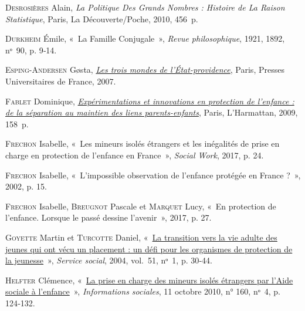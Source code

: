 \documentclass[
  12,
  a4paper,
]{report}
\newlength{\cslhangindent}
\newlength{\cslentryspacingunit} %
\newenvironment{CSLReferences}[2] %
 {%
  \setlength{\parindent}{0pt}
  \ifodd #1
  \let\oldpar\par
  \def\par{\hangindent=\cslhangindent\oldpar}
  \fi
  \setlength{\parskip}{#2\cslentryspacingunit}
 }%
 {}
\begin{document}
\begin{CSLReferences}{0}{0}
\leavevmode{}%
\textsc{Desrosières} Alain, \emph{La Politique Des Grands Nombres :
Histoire de La Raison Statistique}, {Paris}, {La Découverte/Poche},
2010, 456~p.

\leavevmode{}%
\textsc{Durkheim} Émile, {«~La Famille Conjugale~»}, \emph{Revue
philosophique}, 1921, 1892, nᵒ~90, p. 9‑14.

\leavevmode{}%
\textsc{Esping-Andersen} Gøsta,
\emph{\href{https://doi.org/10.3917/puf.espin.2007.01}{Les trois mondes
de l'État-providence}}, {Paris}, {Presses Universitaires de France},
2007.

\leavevmode{}%
\textsc{Fablet} Dominique,
\emph{\href{https://books.google.com?id=1sVU7YJiU0wC}{Expérimentations
et innovations en protection de l'enfance : de la séparation au maintien
des liens parents-enfants}}, {Paris}, {L'Harmattan}, 2009, 158~p.

\leavevmode{}%
\textsc{Frechon} Isabelle, {«~Les mineurs isolés étrangers et les
inégalités de prise en charge en protection de l'enfance en France~»},
\emph{Social Work}, 2017, p. 24.

\leavevmode{}%
\textsc{Frechon} Isabelle, {«~L'impossible observation de l'enfance
protégée en France ?~»}, 2002, p. 15.

\leavevmode{}%
\textsc{Frechon} Isabelle, \textsc{Breugnot} Pascale et \textsc{Marquet}
Lucy, {«~En protection de l'enfance. Lorsque le passé dessine
l'avenir~»}, 2017, p. 27.

\leavevmode{}%
\textsc{Goyette} Martin et \textsc{Turcotte} Daniel,
{«~\href{https://doi.org/10.7202/012710ar}{La transition vers la vie
adulte des jeunes qui ont vécu un placement : un défi pour les
organismes de protection de la jeunesse}~»}, \emph{Service social},
2004, vol.~51, nᵒ~1, p. 30‑44.

\leavevmode{}%
\textsc{Helfter} Clémence,
{«~\href{http://www.cairn.info/journal-informations-sociales-2010-4-page-124.htm}{La
prise en charge des mineurs isolés étrangers par l'Aide sociale à
l'enfance}~»}, \emph{Informations sociales}, 11 octobre 2010, n° 160,
nᵒ~4, p. 124‑132.


\end{CSLReferences}
\end{document}
